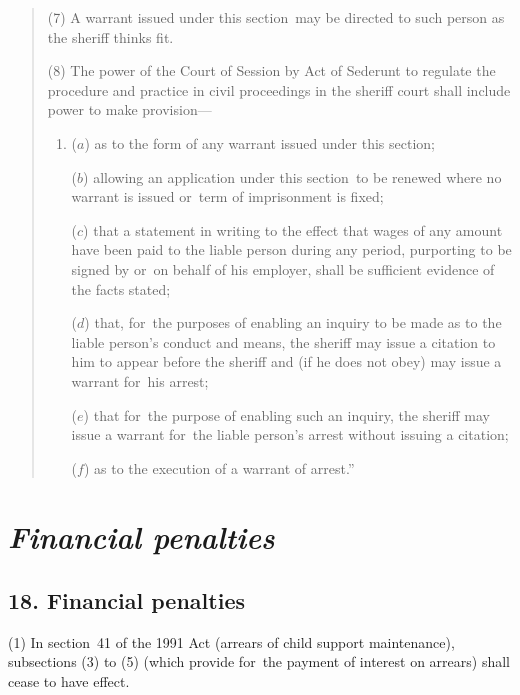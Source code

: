 \documentclass[12pt,a4paper]{article}
\begin{document}
\begin{quotation}
(7) A warrant issued under this section~may be directed to such person as the sheriff thinks fit.

(8) The power of the Court of Session by Act of Sederunt to regulate the procedure and practice in civil proceedings in the sheriff court shall include power to make provision—
\begin{enumerate}\item[]
($a$) as to the form of any warrant issued under this section;

($b$) allowing an application under this section~to be renewed where no warrant is issued or~term of imprisonment is fixed;

($c$) that a statement in writing to the effect that wages of any amount have been paid to the liable person during any period, purporting to be signed by or~on behalf of his employer, shall be sufficient evidence of the facts stated;

($d$) that, for~the purposes of enabling an inquiry to be made as to the liable person’s conduct and means, the sheriff may issue a citation to him to appear before the sheriff and (if he does not obey) may issue a warrant for~his arrest;

($e$) that for~the purpose of enabling such an inquiry, the sheriff may issue a warrant for~the liable person’s arrest without issuing a citation;

($f$) as to the execution of a warrant of arrest.”
\end{enumerate}
\end{quotation}

\section{\itshape Financial penalties}

\subsection{18. Financial penalties}

(1) In section~41 of the 1991 Act (arrears of child support maintenance), subsections (3)  to (5)  (which provide for~the payment of interest on arrears) shall cease to have effect.
\end{document}

